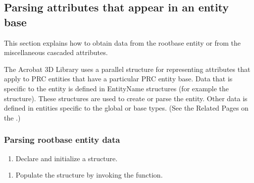 \documentclass[letterpaper,12pt,english,openany,oneside]{sphinxmanual}
\begin{document}
\subsection{Parsing attributes that appear in an entity base}
\label{\detokenize{Plugins_A3D_API:parsing-attributes-that-appear-in-an-entity-base}}
This section explains how to obtain data from the root\sphinxhyphen{}base entity or from the miscellaneous cascaded attributes.

The Acrobat 3D Library uses a parallel structure for representing attributes that apply to PRC entities that have a particular PRC entity base. Data that is specific to the entity is defined in  EntityName  structures (for example the  structure). These structures are used to create or parse the entity. Other data is defined in entities specific to the global or base types. (See the Related Pages on the .)


\subsubsection{Parsing root\sphinxhyphen{}base entity data}
\label{\detokenize{Plugins_A3D_API:parsing-root-base-entity-data}}\begin{enumerate}
%
\item {} 
Declare and initialize a  structure.

\end{enumerate}

\begin{sphinxVerbatim}[commandchars=\\\{\}]
 
\end{sphinxVerbatim}
\begin{enumerate}
%
\setcounter{enumi}{1}
\item {} 
Populate the  structure by invoking the  function.

\end{enumerate}
\end{document}
